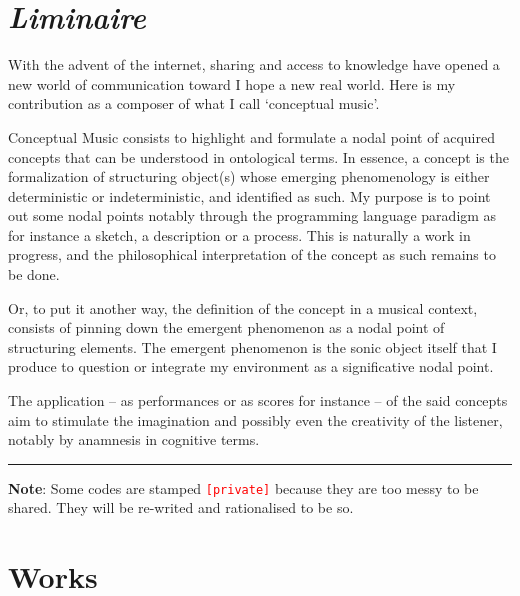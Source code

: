 \chapter*{\textsl{Liminaire}}

\thispagestyle{empty}

\bigskip

With the advent of the internet, sharing and access to knowledge have opened a new world of communication toward I hope a new real world. Here is my contribution as a composer of what I call `conceptual music'.						
\bigskip

Conceptual Music consists to highlight and formulate a nodal point of acquired concepts that can be understood in ontological terms. In essence, a concept is the formalization of structuring object(s) whose emerging phenomenology is either deterministic or indeterministic, and identified as such. My purpose is to point out some nodal points notably through the programming language paradigm as for instance a sketch, a description or a process. This is naturally a work in progress, and the philosophical interpretation of the concept as such remains to be done.						

Or, to put it another way, the definition of the concept in a musical context, consists of pinning down the emergent phenomenon as a nodal point of structuring elements. The emergent phenomenon is the sonic object itself that I produce to question or integrate my environment as a significative nodal point.

\bigskip
 
The application -- as performances or as scores for instance -- of the said concepts aim to stimulate the imagination and possibly even the creativity of the listener, notably by anamnesis in cognitive terms.										

\bigskip

\begin{center}\rule{0.5\linewidth}{0.5pt}\end{center}

\bigskip
\bigskip

\textbf{Note}: Some codes are stamped \texttt{\textcolor{red}{\small[private]}} because they are too messy to be shared. They will be re-writed and rationalised to be so.

\chapter*{Works}

